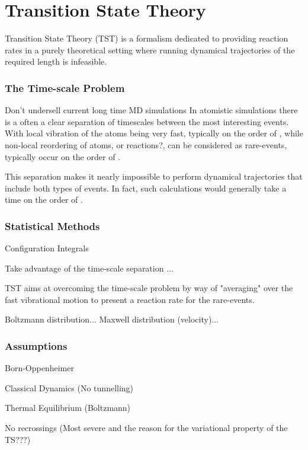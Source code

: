 \section{Transition State Theory}
\label{sec:tst}

Transition State Theory (TST) is a formalism dedicated to providing reaction rates in a purely theoretical setting where running dynamical trajectories of the required length is infeasible.

\recent

\incomplete

\subsubsection{The Time-scale Problem}
\bit
\item Don't undersell current long time MD simulations
\eit
{}
In atomistic simulations there is a often a clear separation of timescales between the most interesting events.
With local vibration of the atoms being very fast, typically on the order of \missing,
while non-local reordering of atoms, or reactions?, can be considered as rare-events, typically occur on the order of \missing.

This separation makes it nearly impossible to perform dynamical trajectories that include both types of events.
In fact, such calculations would generally take a time on the order of \missing.

\recent

\incomplete

\subsubsection{Statistical Methods}

\bit
\item Configuration Integrals
\eit

Take advantage of the time-scale separation ...

TST aims at overcoming the time-scale problem by way of "averaging" over the fast vibrational motion to present a reaction rate for the rare-events.

Boltzmann distribution...
Maxwell distribution (velocity)...

\incomplete

\subsubsection{Assumptions}
\bit
\item Born-Oppenheimer
\item Classical Dynamics (No tunnelling)
\item Thermal Equilibrium (Boltzmann)
\item No recrossings (Most severe and the reason for the variational property of the TS???)
\eit
\placeholder

